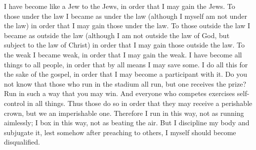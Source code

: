 \begin{biblechapter}
\verse I have become like a Jew to the Jews, in order that I may gain the Jews. To those under the law I became as under the law (although I myself am not under the law) in order that I may gain those under the law.
\verse To those outside the law I became as outside the law (although I am not outside the law of God, but subject to the law of Christ) in order that I may gain those outside the law.
\verse To the weak I became weak, in order that I may gain the weak. I have become all things to all people, in order that by all means I may save some.
\verse I do all this for the sake of the gospel, in order that I may become a participant with it.
\verse Do you not know that those who run in the stadium all run, but one receives the prize? Run in such a way that you may win.
\verse And everyone who competes exercises self-control in all things. Thus those do so in order that they may receive a perishable crown, but we an imperishable one.
\verse Therefore I run in this way, not as running aimlessly; I box in this way, not as beating the air.
\verse But I discipline my body and subjugate it, lest somehow after preaching to others, I myself should become disqualified.
\end{biblechapter}

